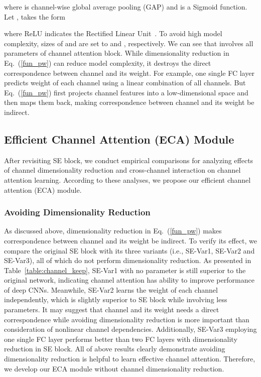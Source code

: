 \documentclass[10pt,twocolumn,letterpaper]{article}
\begin{document}
where  is channel-wise global average pooling (GAP) and  is a Sigmoid function. Let ,   takes the form

where ReLU indicates the Rectified Linear Unit~\cite{DBLP:conf/icml/NairH10}. To avoid high model complexity, sizes of  and  are set to  and , respectively. We can see that  involves all parameters of channel attention block. While dimensionality reduction in Eq.~(\ref{fun_pw}) can reduce model complexity, it  destroys the direct correspondence between channel and its weight. For example, one single FC layer predicts weight of each channel using a linear combination of all channels. But Eq.~(\ref{fun_pw}) first projects channel features into a low-dimensional space and then maps them back, making correspondence between channel and its weight be indirect.

\subsection{Efficient Channel Attention (ECA) Module}
After revisiting SE block, we conduct empirical comparisons for analyzing effects of channel dimensionality reduction and cross-channel interaction on channel attention learning. According to these analyses, we propose our efficient channel attention (ECA) module.

\subsubsection{Avoiding Dimensionality Reduction} As discussed above, dimensionality reduction in Eq.~(\ref{fun_pw}) makes correspondence between channel and its weight be indirect. To verify its effect, we compare the original SE block with its three variants (i.e., SE-Var1, SE-Var2 and SE-Var3), all of which do not perform dimensionality reduction. As presented in Table~\ref{table:channel_keep}, SE-Var1 with no parameter is still superior to the original network, indicating channel attention has ability to improve performance of deep CNNs. Meanwhile, SE-Var2 learns the weight of each channel independently, which is slightly superior to SE block while involving less parameters. It may suggest that channel and its weight needs a direct correspondence while avoiding dimensionality reduction is more important than consideration of nonlinear channel dependencies. Additionally, SE-Var3 employing one single FC layer performs better than two FC layers with dimensionality reduction in SE block. All of above results clearly demonstrate avoiding dimensionality reduction is helpful to learn effective channel attention. Therefore, we develop our ECA module without channel dimensionality reduction.
\end{document}
